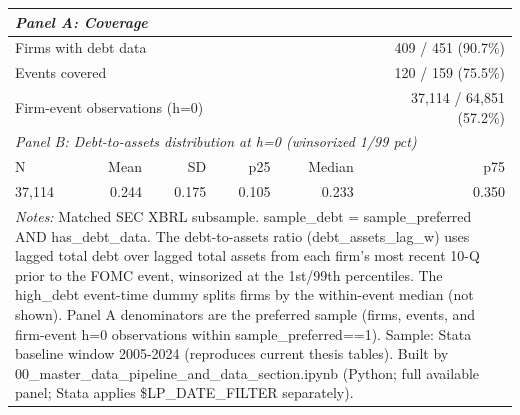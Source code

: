 \begin{tabular}{l r r r r r}
\toprule
\multicolumn{6}{l}{\textit{Panel A: Coverage}} \\
\midrule
\multicolumn{5}{l}{Firms with debt data} & 409 / 451 (90.7\%) \\
\multicolumn{5}{l}{Events covered} & 120 / 159 (75.5\%) \\
\multicolumn{5}{l}{Firm-event observations (h=0)} & 37,114 / 64,851 (57.2\%) \\
\midrule
\multicolumn{6}{l}{\textit{Panel B: Debt-to-assets distribution at h=0 (winsorized 1/99 pct)}} \\
\midrule
N & Mean & SD & p25 & Median & p75 \\
\midrule
37,114 & 0.244 & 0.175 & 0.105 & 0.233 & 0.350 \\
\bottomrule
\multicolumn{6}{p{\linewidth}}{\footnotesize \textit{Notes:} Matched SEC XBRL subsample. sample\_debt = sample\_preferred AND has\_debt\_data. The debt-to-assets ratio (debt\_assets\_lag\_w) uses lagged total debt over lagged total assets from each firm's most recent 10-Q prior to the FOMC event, winsorized at the 1st/99th percentiles. The high\_debt event-time dummy splits firms by the within-event median (not shown). Panel A denominators are the preferred sample (firms, events, and firm-event h=0 observations within sample\_preferred==1). Sample: Stata baseline window 2005-2024 (reproduces current thesis tables). Built by 00\_master\_data\_pipeline\_and\_data\_section.ipynb (Python; full available panel; Stata applies \$LP\_DATE\_FILTER separately).} \\
\end{tabular}
